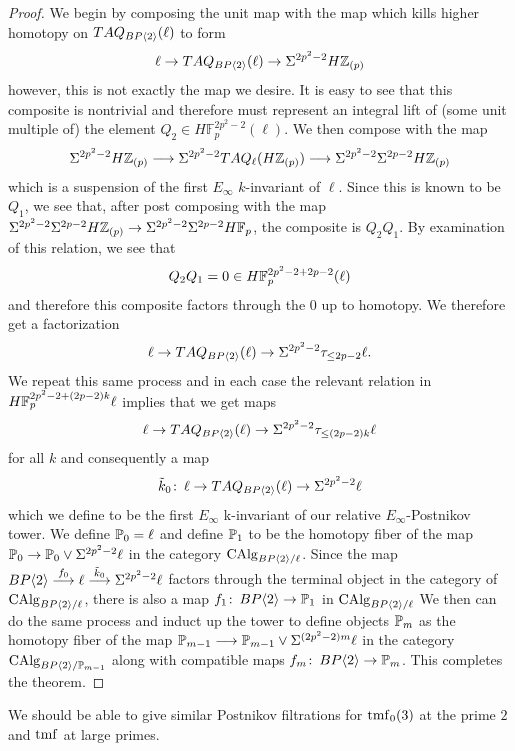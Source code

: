 \begin{proof}
We begin by composing the unit map with the map which kills higher homotopy on $TAQ_{BP\langle 2 \rangle}(\ell)$ to form 
\[ \ell \to TAQ_{BP\langle 2 \rangle}(\ell)\to \Sigma^{2p^2-2}H\mathbb{Z}_{(p)}\]
however, this is not exactly the map we desire. It is easy to see that this composite is nontrivial and therefore must represent an integral lift of (some unit multiple of) the element $Q_2\in H\mathbb{F}_p^{2p^2-2}(\ell)$. We  then compose with the map 
\[ \Sigma^{2p^2-2}H\mathbb{Z}_{(p)}\longrightarrow \Sigma^{2p^2-2}TAQ_{\ell}(H\mathbb{Z}_{(p)})\longrightarrow \Sigma^{2p^2-2}\Sigma^{2p-2}H\mathbb{Z}_{(p)}\]
which is a suspension of the first $E_{\infty}$ $k$-invariant of $\ell$. Since this is known to be $Q_1$, we see that, after post composing with the map $\Sigma^{2p^2-2}\Sigma^{2p-2}H\mathbb{Z}_{(p)}\to \Sigma^{2p^2-2}\Sigma^{2p-2}H\mathbb{F}_p$, the composite is $Q_2Q_1$. By examination of this relation, we see that 
\[Q_2Q_1=0\in H\mathbb{F}_p^{2p^2-2+2p-2}(\ell)\] 
and therefore this composite factors through the $0$ up to homotopy. We therefore get a factorization 
\[ \ell \to TAQ_{BP\langle 2 \rangle}(\ell)\to \Sigma^{2p^2-2}\tau_{\le 2p-2}\ell .\]
We repeat this same process and in each case the relevant relation in $H\mathbb{F}_p^{2p^2-2+(2p-2)k}\ell$ implies that we get maps 
\[ \ell \to TAQ_{BP\langle 2 \rangle}(\ell)\to \Sigma^{2p^2-2}\tau_{\le (2p-2)k}\ell \]
for all $k$ and consequently a map 
\[ \tilde{k}_0\colon \thinspace \ell \to TAQ_{BP\langle 2 \rangle}(\ell)\to \Sigma^{2p^2-2}\ell \]
which we define to be the first $E_{\infty}$ k-invariant of our relative $E_{\infty}$-Postnikov tower. We define $\mathbb{P}_0=\ell$ and define $\mathbb{P}_1$ to be the homotopy fiber of the map $\mathbb{P}_0\to \mathbb{P}_0\vee \Sigma^{2p^2-2}\ell$ in the category $\operatorname{CAlg}_{BP\langle 2 \rangle/\ell}$. Since the map $BP\langle 2 \rangle\overset{f_0}{\longrightarrow} \ell \overset{\tilde{k}_0}{\longrightarrow}\Sigma^{2p^2-2}\ell$ factors through the terminal object in the category of $\operatorname{CAlg}_{BP\langle 2 \rangle/\ell}$, there is also a map $f_1\colon \thinspace BP\langle 2 \rangle\to \mathbb{P}_1$ in $\operatorname{CAlg}_{BP\langle 2 \rangle/\ell}$
We then can do the same process and induct up the tower to define objects $\mathbb{P}_m$ as the homotopy fiber of the map $\mathbb{P}_{m-1} \longrightarrow \mathbb{P}_{m-1}\vee\Sigma^{(2p^2-2)m}\ell$
in the category $\operatorname{CAlg}_{BP\langle 2 \rangle/\mathbb{P}_{m-1}}$ along with compatible maps $f_m\colon \thinspace BP\langle 2 \rangle\to \mathbb{P}_m$. This completes the theorem. 
\end{proof}
\begin{rem}
We should be able to give similar Postnikov filtrations for $\mathrm{tmf}_{0}(3)$ at the prime $2$ and $\mathrm{tmf}$ at large primes. 
\end{rem}